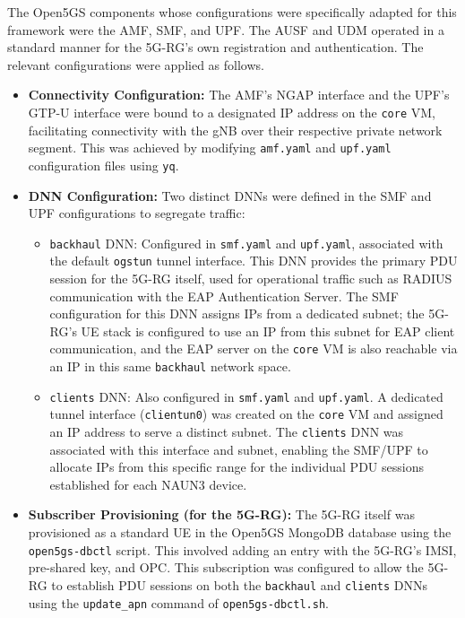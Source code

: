 The Open5GS components whose configurations were specifically adapted for this framework were the \ac{AMF}, \ac{SMF}, and \ac{UPF}. The \ac{AUSF} and \ac{UDM} operated in a standard manner for the \ac{5G-RG}'s own registration and authentication. The relevant configurations were applied as follows.

\begin{itemize}
    \item \textbf{Connectivity Configuration:} The \ac{AMF}'s \ac{NGAP} interface and the \ac{UPF}'s \ac{GTP-U} interface were bound to a designated \ac{IP} address on the \texttt{core} \ac{VM}, facilitating connectivity with the \ac{gNB} over their respective private network segment. This was achieved by modifying \texttt{amf.yaml} and \texttt{upf.yaml} configuration files using \texttt{yq}.

    \item{
        \textbf{\ac{DNN} Configuration:} Two distinct \acp{DNN} were defined in the \ac{SMF} and \ac{UPF} configurations to segregate traffic:

        \begin{itemize}
            \item \texttt{backhaul} \ac{DNN}: Configured in \texttt{smf.yaml} and \texttt{upf.yaml}, associated with the default \texttt{ogstun} tunnel interface. This \ac{DNN} provides the primary \ac{PDU} session for the \ac{5G-RG} itself, used for operational traffic such as \ac{RADIUS} communication with the \ac{EAP} Authentication Server. The \ac{SMF} configuration for this \ac{DNN} assigns \ac{IP}s from a dedicated subnet; the \ac{5G-RG}'s \ac{UE} stack is configured to use an \ac{IP} from this subnet for \ac{EAP} client communication, and the \ac{EAP} server on the \texttt{core} \ac{VM} is also reachable via an \ac{IP} in this same \texttt{backhaul} network space.

            \item \texttt{clients} \ac{DNN}: Also configured in \texttt{smf.yaml} and \texttt{upf.yaml}. A dedicated tunnel interface (\texttt{clientun0}) was created on the \texttt{core} \ac{VM} and assigned an \ac{IP} address to serve a distinct subnet. The \texttt{clients} \ac{DNN} was associated with this interface and subnet, enabling the \ac{SMF}/\ac{UPF} to allocate \acp{IP} from this specific range for the individual \ac{PDU} sessions established for each \ac{NAUN3} device.
        \end{itemize}
    }

    \item \textbf{Subscriber Provisioning (for the \ac{5G-RG}):} The \ac{5G-RG} itself was provisioned as a standard \ac{UE} in the Open5GS MongoDB database using the \texttt{open5gs-dbctl} script. This involved adding an entry with the \ac{5G-RG}'s \ac{IMSI}, pre-shared key, and \ac{OPC}. This subscription was configured to allow the \ac{5G-RG} to establish \ac{PDU} sessions on both the \texttt{backhaul} and \texttt{clients} \acp{DNN} using the \texttt{update\_apn} command of \texttt{open5gs-dbctl.sh}.
\end{itemize}

